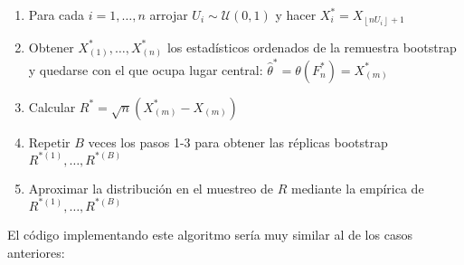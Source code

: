 \documentclass[]{book}
\theoremstyle{break}
\theoremstyle{definition}
\theoremstyle{definition}
\theoremstyle{definition}
\theoremstyle{remark}
\begin{document}
\begin{enumerate}
\def\labelenumi{\arabic{enumi}.}
\item
  Para cada \(i=1,\ldots ,n\) arrojar
  \(U_i\sim \mathcal{U}\left( 0,1 \right)\) y hacer
  \(X_i^{\ast}=X_{\left\lfloor nU_i\right\rfloor +1}\)
\item
  Obtener \(X_{(1)}^{\ast},\ldots ,X_{(n)}^{\ast}\) los estadísticos
  ordenados de la remuestra bootstrap y quedarse con el que ocupa lugar
  central:
  \(\hat{\theta}^{\ast}=\theta \left( F_n^{\ast} \right) =X_{(m)}^{\ast}\)
\item
  Calcular
  \(R^{\ast}=\sqrt{n}\left( X_{(m)}^{\ast}-X_{\left(m \right)} \right)\)
\item
  Repetir \(B\) veces los pasos 1-3 para obtener las réplicas bootstrap
  \(R^{\ast (1)}, \ldots, R^{\ast (B)}\)
\item
  Aproximar la distribución en el muestreo de \(R\) mediante la empírica
  de \(R^{\ast (1)}, \ldots, R^{\ast (B)}\)
\end{enumerate}

El código implementando este algoritmo sería muy similar al de los casos
anteriores:
\end{document}

